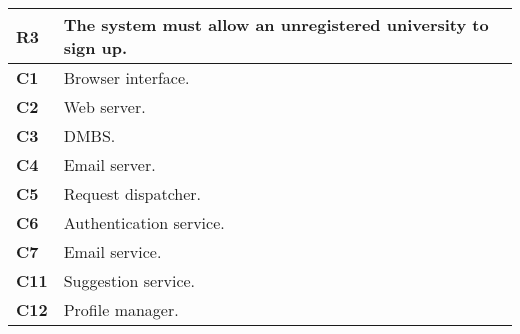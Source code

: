 \begin{table}[H]
    \centering
    \begin{tabular}{|l|m{10cm}|}
        \hline \textbf{R3} & The system must allow an unregistered university to sign up. \\
        \hline \textbf{C1} & Browser interface. \\
        \hline \textbf{C2} & Web server. \\
        \hline \textbf{C3} & DMBS. \\
        \hline \textbf{C4} & Email server. \\
        \hline \textbf{C5} & Request dispatcher. \\
        \hline \textbf{C6} & Authentication service. \\
        \hline \textbf{C7} & Email service. \\
        \hline \textbf{C11} & Suggestion service. \\
        \hline \textbf{C12} & Profile manager.\\
        \hline
    \end{tabular}
\end{table}

